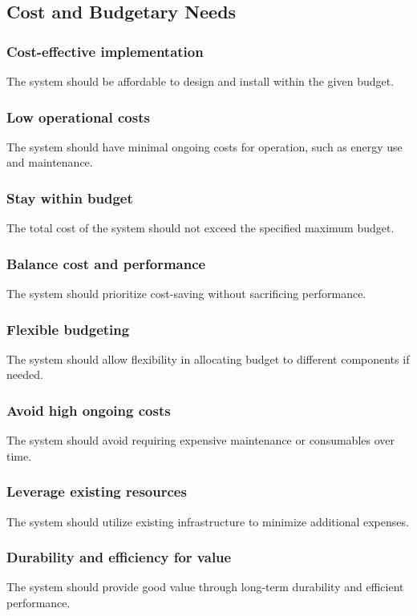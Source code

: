 \documentclass[11pt]{article}
\begin{document}
\newpage
\subsection{Cost and Budgetary Needs}

\subsubsection{Cost-effective implementation}
The system should be affordable to design and install within the given budget.

\subsubsection{Low operational costs}
The system should have minimal ongoing costs for operation, such as energy use and maintenance.

\subsubsection{Stay within budget}
The total cost of the system should not exceed the specified maximum budget.

\subsubsection{Balance cost and performance}
The system should prioritize cost-saving without sacrificing performance.

\subsubsection{Flexible budgeting}
The system should allow flexibility in allocating budget to different components if needed.

\subsubsection{Avoid high ongoing costs}
The system should avoid requiring expensive maintenance or consumables over time.

\subsubsection{Leverage existing resources}
The system should utilize existing infrastructure to minimize additional expenses.

\subsubsection{Durability and efficiency for value}
The system should provide good value through long-term durability and efficient performance.
\end{document}
